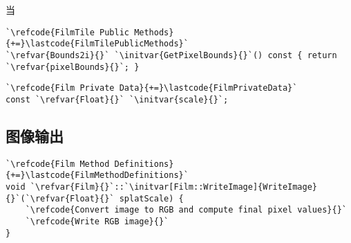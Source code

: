当
\begin{lstlisting}
`\refcode{FilmTile Public Methods}{+=}\lastcode{FilmTilePublicMethods}`
`\refvar{Bounds2i}{}` `\initvar{GetPixelBounds}{}`() const { return `\refvar{pixelBounds}{}`; }
\end{lstlisting}
\begin{lstlisting}
`\refcode{Film Private Data}{+=}\lastcode{FilmPrivateData}`
const `\refvar{Float}{}` `\initvar{scale}{}`;
\end{lstlisting}

\subsection{图像输出}\label{sub:图像输出}
\begin{lstlisting}
`\refcode{Film Method Definitions}{+=}\lastcode{FilmMethodDefinitions}`
void `\refvar{Film}{}`::`\initvar[Film::WriteImage]{WriteImage}{}`(`\refvar{Float}{}` splatScale) {
    `\refcode{Convert image to RGB and compute final pixel values}{}`
    `\refcode{Write RGB image}{}`
}
\end{lstlisting}